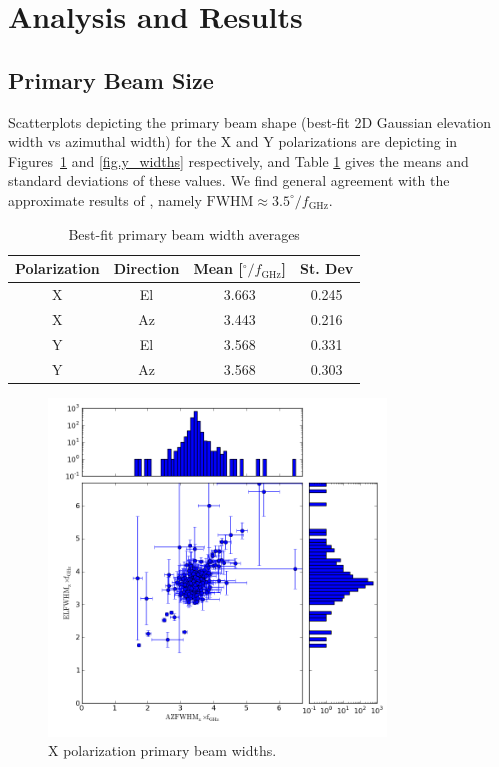 \documentclass[preprint]{aastex}
\begin{document}
\section{Analysis and Results}\label{s.results}

\subsection{Primary Beam Size}\label{ss.beamsize}
Scatterplots depicting the primary beam shape (best-fit 2D Gaussian
elevation width vs azimuthal width) for the X and Y polarizations are
depicting in Figures~\ref{fig.x_widths} and \ref{fig.y_widths}
respectively, and Table \ref{tab.widths} gives the means and standard
deviations of these values.  We find general agreement with the
approximate results of \citet{Harp2011}, namely $\textrm{FWHM} \approx
3.5^{\circ} / f_\textrm{GHz}$.

\begin{table}[htb]
\begin{center}
\begin{tabular}{cccc}
Polarization & Direction & Mean [$^{\circ} / f_\textrm{GHz}$] & St. Dev \\
\hline
X & El & 3.663 & 0.245 \\
X & Az & 3.443 & 0.216 \\
Y & El & 3.568 & 0.331 \\
Y & Az & 3.568 & 0.303
\end{tabular}
\caption{Best-fit primary beam width averages \label{tab.widths}}
\end{center}
\end{table}

\begin{figure}[htb]
\begin{center}
\includegraphics[width=0.8\textwidth]{images/x_widths}
\caption{X polarization primary beam widths. \label{fig.x_widths}}
\end{center}
\end{figure}
\end{document}
